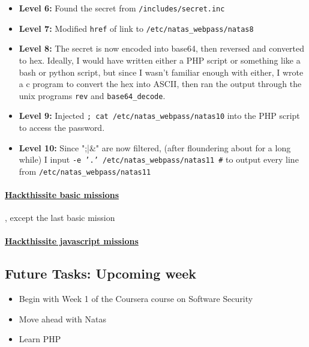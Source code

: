 \documentclass{article}
\def\code#1{\texttt{#1}}
\begin{document}
\begin{itemize}
\begin{itemize}
    \item \textbf{Level 6: } Found the secret from \code{/includes/secret.inc}
    
    \item \textbf{Level 7: } Modified \code{href} of link to \code{/etc/natas\_webpass/natas8}
    
    \item \textbf{Level 8: } The secret is now encoded into base64, then reversed and converted to hex. Ideally, I would have written either a PHP script or something like a bash or python script, but since I wasn't familiar enough with either, I wrote a c program to convert the hex into ASCII, then ran the output through the unix programs \code{rev} and \code{base64\_decode}.
    
    \item \textbf{Level 9: } Injected \code{; cat /etc/natas\_webpass/natas10} into the PHP script to access the password.
    
    \item \textbf{Level 10: } Since ";|\&" are now filtered, (after floundering about for a long while) I input \code{-e '.' /etc/natas\_webpass/natas11 \#} to output every line from \code{/etc/natas\_webpass/natas11}
    
\end{itemize}

\paragraph{\href{http://hackthissite.org/missions/basic}{Hackthissite basic missions}}, except the last basic mission

\paragraph{\href{http://hackthissite.org/missions/javascript}{Hackthissite javascript missions}}

\subsection*{Future Tasks: Upcoming week}
\begin{itemize}
    \item Begin with Week 1 of the Coursera course on Software Security
    \item Move ahead with Natas
    \item Learn PHP
\end{itemize}


\end{itemize}
\end{document}
